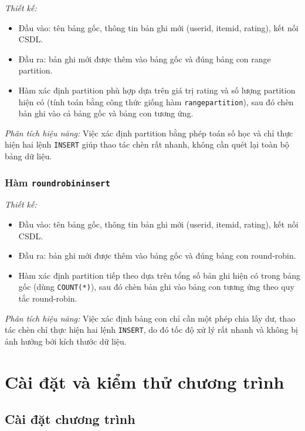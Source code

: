 \documentclass[14pt]{extarticle}
\begin{document}
\textit{Thiết kế:}
\begin{itemize}
    \item Đầu vào: tên bảng gốc, thông tin bản ghi mới (userid, itemid, rating), kết nối CSDL.
    \item Đầu ra: bản ghi mới được thêm vào bảng gốc và đúng bảng con range partition.
    \item Hàm xác định partition phù hợp dựa trên giá trị rating và số lượng partition hiện có (tính toán bằng công thức giống hàm \texttt{rangepartition}), sau đó chèn bản ghi vào cả bảng gốc và bảng con tương ứng.
\end{itemize}
\textit{Phân tích hiệu năng:}  
Việc xác định partition bằng phép toán số học và chỉ thực hiện hai lệnh \texttt{INSERT} giúp thao tác chèn rất nhanh, không cần quét lại toàn bộ bảng dữ liệu.

\subsubsection{Hàm \texttt{roundrobininsert}}

\textit{Thiết kế:}
\begin{itemize}
    \item Đầu vào: tên bảng gốc, thông tin bản ghi mới (userid, itemid, rating), kết nối CSDL.
    \item Đầu ra: bản ghi mới được thêm vào bảng gốc và đúng bảng con round-robin.
    \item Hàm xác định partition tiếp theo dựa trên tổng số bản ghi hiện có trong bảng gốc (dùng \texttt{COUNT(*)}), sau đó chèn bản ghi vào bảng con tương ứng theo quy tắc round-robin.
\end{itemize}
\textit{Phân tích hiệu năng:}  
Việc xác định bảng con chỉ cần một phép chia lấy dư, thao tác chèn chỉ thực hiện hai lệnh \texttt{INSERT}, do đó tốc độ xử lý rất nhanh và không bị ảnh hưởng bởi kích thước dữ liệu.
\newpage

\section{Cài đặt và kiểm thử chương trình}
\subsection{Cài đặt chương trình}
\end{document}
